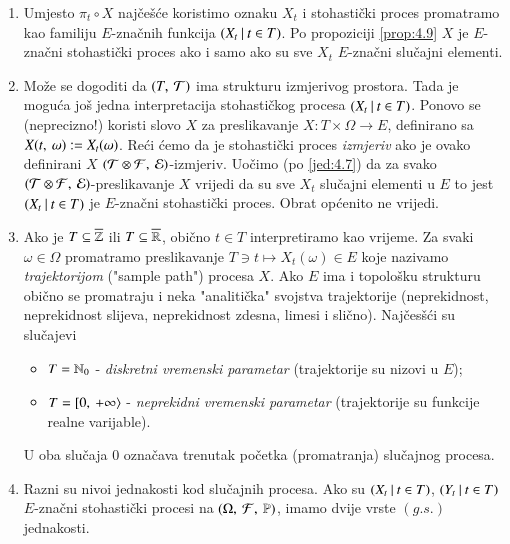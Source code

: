 \begin{nap} \label{nap:8.2}
    \begin{enumerate}[label=(\alph*)]
        \item Umjesto $\pi_t \circ X$ naj\v ce\v s\' ce koristimo oznaku $X_t$ i stohasti\v cki proces promatramo kao familiju $E$-zna\v cnih funkcija $({X_t} \: | \: {t \in T})$.
        Po propoziciji \ref{prop:4.9} $X$ je $E$-zna\v cni stohasti\v cki proces ako i samo ako su sve $X_t$ $E$-zna\v cni slu\v cajni elementi.
        \item Mo\v ze se dogoditi da $({T}, \: {\mathcal{T}})$ ima strukturu izmjerivog prostora.
        Tada je mogu\' ca jo\v s jedna interpretacija stohasti\v ckog procesa $({X_t} \: | \: {t \in T})$.
        Ponovo se (neprecizno!) koristi slovo $X$ za preslikavanje $X : T \times \Omega \to E$, definirano sa $X ({t}, \: {\omega}) := X_t (\omega)$.
        Re\' ci \' cemo da je stohasti\v cki proces \emph{izmjeriv} ako je ovako definirani $X$ $({\mathcal{T} \otimes \mathcal{F}}, \: {\mathcal{E}})$-izmjeriv.
        Uo\v cimo (po \eqref{jed:4.7}) da za svako $({\mathcal{T} \otimes \mathcal{F}}, \: {\mathcal{E}})$-preslikavanje $X$ vrijedi da su sve $X_t$ slu\v cajni elementi u $E$ to jest $({X_t} \: | \: {t \in T})$ je $E$-zna\v cni stohasti\v cki proces.
        Obrat op\' cenito ne vrijedi.
        \item Ako je $T \subseteq \overline{\mathbb{Z}}$ ili $T \subseteq \overline{\mathbb{R}}$, obi\v cno $t \in T$ interpretiramo kao vrijeme.
        Za svaki $\omega \in \Omega$ promatramo preslikavanje $T \ni t \mapsto X_t (\omega) \in E$ koje nazivamo \emph{trajektorijom} ("sample path") procesa $X$.
        Ako $E$ ima i topolo\v sku strukturu obi\v cno se promatraju i neka "analiti\v cka" svojstva trajektorije (neprekidnost, neprekidnost slijeva, neprekidnost zdesna, limesi i sli\v cno).
        Naj\v ces\v s\' ci su slu\v cajevi
        \begin{itemize}
            \item $T = \mathbb{N}_0$ - \emph{diskretni vremenski parametar} (trajektorije su nizovi u $E$);
            \item $T = [ {0}, \: {+\infty} \rangle$ - \emph{neprekidni vremenski parametar} (trajektorije su funkcije realne varijable).
        \end{itemize}
        U oba slu\v caja $0$ ozna\v cava trenutak po\v cetka  (promatranja) slu\v cajnog procesa.
        \item Razni su nivoi jednakosti kod slu\v cajnih procesa.
        Ako su $({X_t} \: | \: {t \in T})$, $({Y_t} \: | \: {t \in T})$ $E$-zna\v cni stohasti\v cki procesi na $(\Omega, \: \mathcal{F}, \: \mathbb{P})$, imamo dvije vrste $(g.s.)$ jednakosti.

\end{enumerate}
\end{nap}
